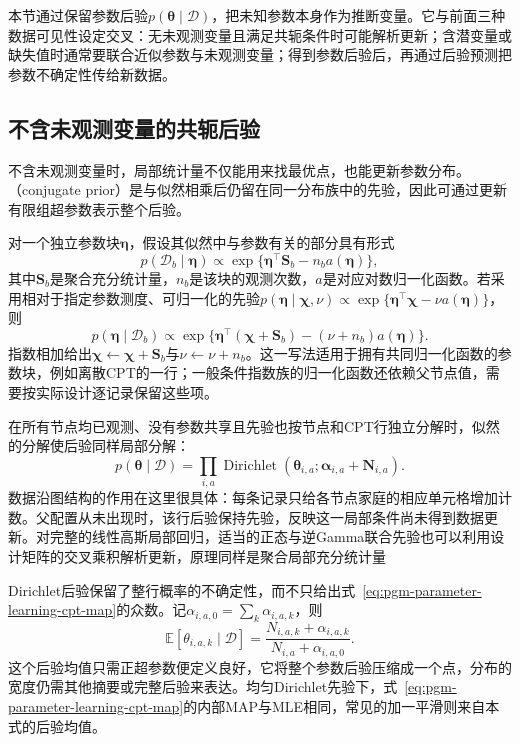 本节通过保留参数后验$p(\bm{\theta}\mid\mathcal{D})$，把未知参数本身作为推断变量。它与前面三种数据可见性设定交叉：无未观测变量且满足共轭条件时可能解析更新；含潜变量或缺失值时通常要联合近似参数与未观测变量；得到参数后验后，再通过后验预测把参数不确定性传给新数据。

\subsection{不含未观测变量的共轭后验}
\label{sec:pgm-parameter-learning-conjugacy}

不含未观测变量时，局部统计量不仅能用来找最优点，也能更新参数分布。（conjugate prior）是与似然相乘后仍留在同一分布族中的先验，因此可通过更新有限组超参数表示整个后验。

对一个独立参数块$\bm{\eta}$，假设其似然中与参数有关的部分具有形式
\[
  p(\mathcal{D}_b\mid\bm{\eta})
  \propto\exp\{\bm{\eta}^\top\bm{S}_b-n_ba(\bm{\eta})\},
\]
其中$\bm{S}_b$是聚合充分统计量，$n_b$是该块的观测次数，$a$是对应对数归一化函数。若采用相对于指定参数测度、可归一化的先验$p(\bm{\eta}\mid\bm{\chi},\nu)\propto\exp\{\bm{\eta}^\top\bm{\chi}-\nu a(\bm{\eta})\}$，则
\begin{equation}
  p(\bm{\eta}\mid\mathcal{D}_b)
  \propto
  \exp\{\bm{\eta}^\top(\bm{\chi}+\bm{S}_b)
                 -(\nu+n_b)a(\bm{\eta})\}.
  \label{eq:pgm-parameter-learning-conjugate-update}
\end{equation}
指数相加给出$\bm{\chi}\leftarrow\bm{\chi}+\bm{S}_b$与$\nu\leftarrow\nu+n_b$。这一写法适用于拥有共同归一化函数的参数块，例如离散CPT的一行；一般条件指数族的归一化函数还依赖父节点值，需要按实际设计逐记录保留这些项。

在所有节点均已观测、没有参数共享且先验也按节点和CPT行独立分解时，似然的分解使后验同样局部分解：
\begin{equation}
  p(\bm{\theta}\mid\mathcal{D})
   =\prod_{i,a}
     \operatorname{Dirichlet}
       (\bm{\theta}_{i,a};
        \bm{\alpha}_{i,a}+\bm{N}_{i,a}).
  \label{eq:pgm-parameter-learning-local-posterior}
\end{equation}
数据沿图结构的作用在这里很具体：每条记录只给各节点家庭的相应单元格增加计数。父配置从未出现时，该行后验保持先验，反映这一局部条件尚未得到数据更新。对完整的线性高斯局部回归，适当的正态与逆Gamma联合先验也可以利用设计矩阵的交叉乘积解析更新，原理同样是聚合局部充分统计量

Dirichlet后验保留了整行概率的不确定性，而不只给出式~\eqref{eq:pgm-parameter-learning-cpt-map}的众数。记$\alpha_{i,a,0}=\sum_k\alpha_{i,a,k}$，则
\begin{equation}
  \mathbb{E}[\theta_{i,a,k}\mid\mathcal{D}]
    =\frac{N_{i,a,k}+\alpha_{i,a,k}}
            {N_{i,a}+\alpha_{i,a,0}}.
  \label{eq:pgm-parameter-learning-dirichlet-estimates}
\end{equation}
这个后验均值只需正超参数便定义良好，它将整个参数后验压缩成一个点，分布的宽度仍需其他摘要或完整后验来表达。均匀Dirichlet先验下，式~\eqref{eq:pgm-parameter-learning-cpt-map}的内部MAP与MLE相同，常见的加一平滑则来自本式的后验均值。

